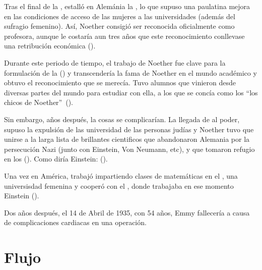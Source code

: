 Tras el final de la , estalló en Alemánia la , lo que supuso una paulatina mejora en las condiciones de acceso de las mujeres a las universidades (además del sufragio femenino).
Así, Noether consigió ser reconocida oficialmente como profesora, aunque le costaría aun tres años que este reconocimiento conllevase una retribución económica (\cite[333]{Carrasco}).

Durante este periodo de tiempo, el trabajo de Noether fue clave para la formulación de la  (\cite{Weyl}) y transcendería la fama de Noether en el mundo académico y obtuvo el reconocimiento que se merecía.
Tuvo alumnos que vinieron desde diversas partes del mundo para estudiar con ella, a los que se concía como los \textquotedblleft los chicos de Noether\textquotedblright\ (\cite{Carrasco}).

Sin embargo, años después, la cosas se complicarían.
La llegada de  al poder, supuso la expulsión de las universidad de las personas judías y Noether tuvo que unirse a la larga lista de brillantes cientificos que abandonaron Alemania por la persecución Nazi (junto con Einstein, Von Neumann, etc), y que tomaron refugio en los  (\cite{Kimberling}).
Como diría Einstein:  (\cite{Einstein}).

Una vez en América, trabajó impartiendo clases de matemáticas en el , una universisdad femenina y cooperó con el , donde trabajaba en ese momento Einstein (\cite{Carrasco}).

Dos años después, el 14 de Abril de 1935, con 54 años, Emmy fallecería a causa de complicaciones cardiacas en una operación.

\section{Flujo}\label{sec:flujo}

